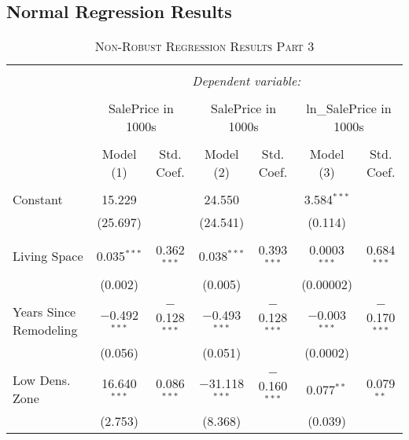 \documentclass[a4paper]{article}
\begin{document}
\subsection{Normal Regression Results}

\begin{table}[!htbp] \centering 
\begin{adjustwidth}{0.cm}{-0cm}
\begin{threeparttable}
\small
\captionsetup{font=small, justification=raggedright,singlelinecheck=false}
\caption{\textsc{Non-Robust Regression Results Part 3}}
\centering 
  \label{}
\small 
\begin{tabular}{@{\extracolsep{-2pt}}lcccccc} 
\\[-5.8ex]\hline 
\hline \\[-1.8ex] 
 & \multicolumn{6}{c}{\textit{Dependent variable:}} \\ 
\cline{2-7} 
\\[-1.8ex] & \multicolumn{2}{c}{SalePrice in 1000s} & \multicolumn{2}{c}{SalePrice in 1000s} & \multicolumn{2}{c}{ln\_SalePrice  in 1000s} \\ 
\\[-1.8ex] & Model (1) & Std. Coef.& Model (2) & Std. Coef.&  Model (3) & Std. Coef.\\ 
\hline \\[-1.8ex] 
 Constant & 15.229 &  & 24.550 &  & 3.584$^{***}$ &  \\ 
  & (25.697) &  & (24.541) &  & (0.114) & \\ 
  & & & & & & \\ 
 Living Space & 0.035$^{***}$ & 0.362$^{***}$ & 0.038$^{***}$ & 0.393$^{***}$ & 0.0003$^{***}$ & 0.684$^{***}$ \\ 
  & (0.002) & & (0.005) & & (0.00002) &  \\ 
  & & & & & & \\ 
 Years Since Remodeling & $-$0.492$^{***}$ & $-$0.128$^{***}$ & $-$0.493$^{***}$ & $-$0.128$^{***}$ & $-$0.003$^{***}$ & $-$0.170$^{***}$ \\ 
  & (0.056) &  & (0.051) &  & (0.0002) &  \\ 
  & & & & & & \\ 
 Low Dens. Zone & 16.640$^{***}$ & 0.086$^{***}$ & $-$31.118$^{***}$ & $-$0.160$^{***}$ & 0.077$^{**}$ & 0.079$^{**}$ \\ 
  & (2.753) &  & (8.368) & & (0.039) &  \\ 

\end{tabular}
\end{threeparttable}
\end{adjustwidth}
\end{table}
\end{document}

